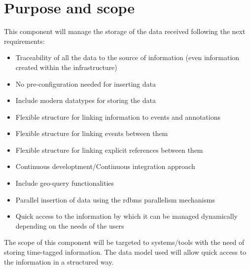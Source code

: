 \chapter{Purpose and scope}

This component will manage the storage of the data received following the next requirements:

\begin{itemize} 

\item Traceability of all the data to the source of information (even information created within the infrastructure)

\item No pre-configuration needed for inserting data

\item Include modern datatypes for storing the data

\item Flexible structure for linking information to events and annotations

\item Flexible structure for linking events between them

\item Flexible structure for linking explicit references between them

\item Continuous developtment/Continuous integration approach

\item Include geo-query functionalities

\item Parallel insertion of data using the \acrshort{rdbms} parallelism mechanisms

\item Quick access to the information by which it can be managed dynamically depending on the needs of the users

\end{itemize}

The scope of this component will be targeted to systems/tools with the need of storing time-tagged information. The data model used will allow quick access to the information in a structured way.
